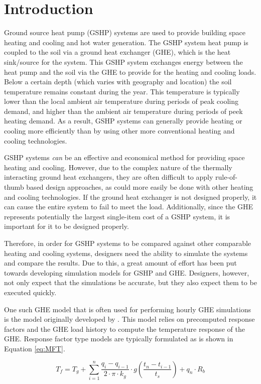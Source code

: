 \documentclass[review,12pt]{elsarticle}
\begin{document}
\section*{Introduction}
Ground source heat pump (GSHP) systems are used to provide building space heating and cooling and hot water generation. The GSHP system heat pump is coupled to the soil via a ground heat exchanger (GHE), which is the heat sink/source for the system. This GSHP system exchanges energy between the heat pump and the soil via the GHE to provide for the heating and cooling loads. Below a certain depth (which varies with geography and location) the soil temperature remains constant during the year. This temperature is typically lower than the local ambient air temperature during periods of peak cooling demand, and higher than the ambient air temperature during periods of peek heating demand. As a result, GSHP systems can generally provide heating or cooling more efficiently than by using other more conventional heating and cooling technologies. 

GSHP systems \textit{can} be an effective and economical method for providing space heating and cooling. However, due to the complex nature of the thermally interacting ground heat exchangers, they are often difficult to apply rule-of-thumb based design approaches, as could more easily be done with other heating and cooling technologies. If the ground heat exchanger is not designed properly, it can cause the entire system to fail to meet the load. Additionally, since the GHE represents potentially the largest single-item cost of a GSHP system, it is important for it to be designed properly.

Therefore, in order for GSHP systems to be compared against other comparable heating and cooling systems, designers need the ability to simulate the systems and compare the results. Due to this, a great amount of effort has been put towards developing simulation models for GSHP and GHE. Designers, however, not only expect that the simulations be accurate, but they also expect them to be executed quickly.

One such GHE model that is often used for performing hourly GHE simulations is the model originally developed by \cite{EskilsonClaesson1988}. This model relies on precomputed response factors and the GHE load history to compute the temperature response of the GHE. Response factor type models are typically formulated as is shown in Equation \ref{eq:MFT}.

\begin{equation}
    T_f = T_g + \sum_{i=1}^n \frac{q_{i} - q_{i-1}}{2 \cdot \pi \cdot k_g} \cdot g\left(\frac{t_n - t_{i-1}}{t_s}\right) +  q_n \cdot R_b
    \label{eq:MFT}
\end{equation}
\end{document}
